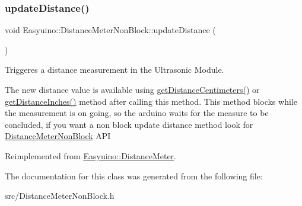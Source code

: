 \subsubsection{\texorpdfstring{update\+Distance()}{updateDistance()}}
{\footnotesize\ttfamily void Easyuino\+::\+Distance\+Meter\+Non\+Block\+::update\+Distance (\begin{DoxyParamCaption}{ }\end{DoxyParamCaption})\hspace{0.3cm}{\ttfamily [virtual]}}



Triggeres a distance measurement in the Ultrasonic Module. 

The new distance value is available using \hyperlink{class_easyuino_1_1_distance_meter_non_block_a00419fc2c2ff7c587735063971aa7464}{get\+Distance\+Centimeters()} or \hyperlink{class_easyuino_1_1_distance_meter_a4e3c650c54382d9af6bca51dcac4e7a3}{get\+Distance\+Inches()} method after calling this method.  This method blocks while the measurement is on going, so the arduino waits for the measure to be concluded, if you want a non block update distance method look for \hyperlink{class_easyuino_1_1_distance_meter_non_block}{Distance\+Meter\+Non\+Block} A\+PI 

Reimplemented from \hyperlink{class_easyuino_1_1_distance_meter_a739197578f06b58faedefd0526d49499}{Easyuino\+::\+Distance\+Meter}.



The documentation for this class was generated from the following file\+:\begin{DoxyCompactItemize}
\item 
src/Distance\+Meter\+Non\+Block.\+h\end{DoxyCompactItemize}
